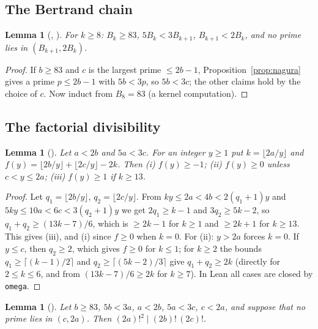 \documentclass[11pt]{amsart}
\theoremstyle{plain}
\newtheorem{lemma}[theorem]{Lemma}
\theoremstyle{definition}
\newcommand{\fl}[1]{\lfloor #1\rfloor}
\begin{document}
\subsection{The Bertrand chain}

\begin{lemma}[, ]\label{lem:chain}
For $k\ge8$: $B_k\ge83$, $5B_k<3B_{k+1}$, $B_{k+1}<2B_k$, and no prime lies in $(B_{k+1},2B_k)$.
\end{lemma}

\begin{proof}
If $b\ge83$ and $c$ is the largest prime $\le2b-1$, Proposition~\ref{prop:nagura} gives a prime $p\le2b-1$ with $5b<3p$, so $5b<3c$; the other claims hold by the choice of $c$. Now induct from $B_8=83$ (a kernel computation).
\end{proof}

\subsection{The factorial divisibility}

\begin{lemma}[]\label{lem:pointwise}
Let $a<2b$ and $5a<3c$. For an integer $y\ge1$ put $k=\fl{2a/y}$ and $f(y)=\fl{2b/y}+\fl{2c/y}-2k$. Then \textup{(i)} $f(y)\ge-1$; \textup{(ii)} $f(y)\ge0$ unless $c<y\le2a$; \textup{(iii)} $f(y)\ge1$ if $k\ge13$.
\end{lemma}

\begin{proof}
Let $q_1=\fl{2b/y}$, $q_2=\fl{2c/y}$. From $ky\le2a<4b<2(q_1+1)y$ and $5ky\le10a<6c<3(q_2+1)y$ we get $2q_1\ge k-1$ and $3q_2\ge5k-2$, so $q_1+q_2\ge(13k-7)/6$, which is $\ge2k-1$ for $k\ge1$ and $\ge2k+1$ for $k\ge13$. This gives (iii), and (i) since $f\ge0$ when $k=0$. For (ii): $y>2a$ forces $k=0$. If $y\le c$, then $q_2\ge2$, which gives $f\ge0$ for $k\le1$; for $k\ge2$ the bounds $q_1\ge\lceil(k-1)/2\rceil$ and $q_2\ge\lceil(5k-2)/3\rceil$ give $q_1+q_2\ge2k$ (directly for $2\le k\le6$, and from $(13k-7)/6\ge2k$ for $k\ge7$). In Lean all cases are closed by \texttt{omega}.
\end{proof}

\begin{lemma}[]\label{lem:factdvd}
Let $b\ge83$, $5b<3a$, $a<2b$, $5a<3c$, $c<2a$, and suppose that no prime lies in $(c,2a)$. Then $(2a)!^2\mid(2b)!\,(2c)!$.
\end{lemma}
\end{document}
